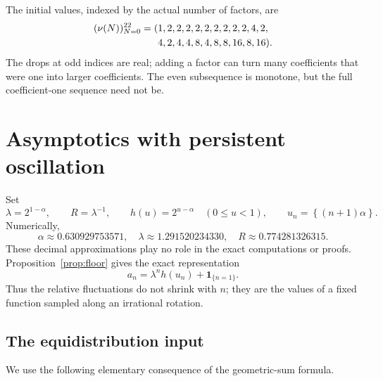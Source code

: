 \documentclass[11pt,letterpaper]{article}
\numberwithin{equation}{section}
\theoremstyle{definition}
\theoremstyle{remark}
\newcommand{\ind}[1]{\boldsymbol{1}_{\{#1\}}}
\newcommand{\fracpart}[1]{\left\{#1\right\}}
\begin{document}
The initial values, indexed by the actual number of factors, are
\begin{equation}\label{eq:fullterms}
\begin{split}
 (\nu(N))_{N=0}^{22}={}&(1,2,2,2,2,2,2,2,2,2,4,2,\\
                     &\hphantom{(}4,2,4,4,8,4,8,8,16,8,16).
\end{split}
\end{equation}
The drops at odd indices are real; adding a factor can turn many coefficients
that were one into larger coefficients. The even subsequence is monotone,
but the full coefficient-one sequence need not be.

\section{Asymptotics with persistent oscillation}\label{sec:asymptotics}

Set
\begin{equation}\label{eq:constants}
 \lambda=2^{1-\alpha},\qquad R=\lambda^{-1},\qquad
 h(u)=2^{u-\alpha}\quad(0\le u<1),\qquad
 u_n=\fracpart{(n+1)\alpha}.
\end{equation}
Numerically,
\[
 \alpha\approx0.630929753571,\quad
 \lambda\approx1.291520234330,\quad
 R\approx0.774281326315.
\]
These decimal approximations play no role in the exact computations or
proofs. Proposition~\ref{prop:floor} gives the exact representation
\begin{equation}\label{eq:profile}
 a_n=\lambda^n h(u_n)+\ind{n=1}.
\end{equation}
Thus the relative fluctuations do not shrink with $n$; they are the values
of a fixed function sampled along an irrational rotation.

\subsection{The equidistribution input}
We use the following elementary consequence of the geometric-sum formula.
\end{document}
